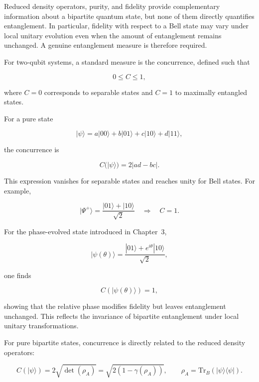 Reduced density operators, purity, and fidelity provide complementary information about a bipartite quantum state, but none of them directly quantifies entanglement. In particular, fidelity with respect to a Bell state may vary under local unitary evolution even when the amount of entanglement remains unchanged. A genuine entanglement measure is therefore required.

\medskip

For two-qubit systems, a standard measure is the concurrence, defined such that

\[
0 \le C \le 1,
\]

where \( C=0 \) corresponds to separable states and \( C=1 \) to maximally entangled states.

\medskip

For a pure state

\[
|\psi\rangle
=
a|00\rangle
+
b|01\rangle
+
c|10\rangle
+
d|11\rangle,
\]

the concurrence is

\begin{equation}
C(|\psi\rangle)
=
2|ad-bc|.
\label{eq:pure_state_concurrence}
\end{equation}

This expression vanishes for separable states and reaches unity for Bell states. For example,

\[
|\Psi^+\rangle
=
\frac{|01\rangle + |10\rangle}{\sqrt{2}}
\quad
\Rightarrow
\quad
C=1.
\]

\medskip

For the phase-evolved state introduced in Chapter~3,

\[
|\psi(\theta)\rangle
=
\frac{|01\rangle + e^{i\theta}|10\rangle}{\sqrt{2}},
\]

one finds

\begin{equation}
C(|\psi(\theta)\rangle)
=
1,
\label{eq:phase_state_concurrence}
\end{equation}

showing that the relative phase modifies fidelity but leaves entanglement unchanged. This reflects the invariance of bipartite entanglement under local unitary transformations.

\medskip

For pure bipartite states, concurrence is directly related to the reduced density operators:

\begin{equation}
C(|\psi\rangle)
=
2\sqrt{\det(\rho_A)}
=
\sqrt{
2\left(
1-\gamma(\rho_A)
\right)
},
\qquad
\rho_A
=
\mathrm{Tr}_B
\left(
|\psi\rangle\langle\psi|
\right).
\label{eq:concurrence_reduced_density_relation}
\end{equation}

